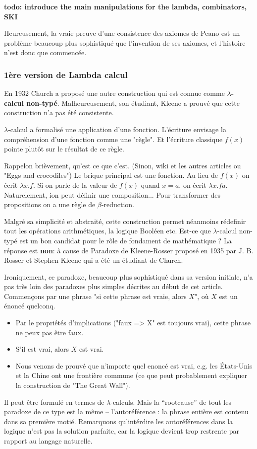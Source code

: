 \documentclass[12pt, a4paper]{article}
\begin{document}
\textbf{todo: introduce the main manipulations for the lambda, combinators, SKI}

Heureusement, la vraie preuve d'une consistence des axiomes de Peano est un problème beaucoup plus sophistiqué que l'invention de ses axiomes, et l'histoire n'est donc que commencée.

\subsubsection*{1ère version de Lambda calcul}
En 1932 Church a proposé une autre construction qui est connue comme \textbf{$\lambda$-calcul non-typé}.
Malheureusement, son étudiant, Kleene a prouvé que cette construction n'a pas été consistente.

$\lambda$-calcul a formalisé une application d'une fonction. L'écriture envisage la compréhension d'une fonction comme une "règle". Et l'écriture classique $f(x)$ pointe plutôt sur le résultat de ce règle.

Rappelon brièvement, qu'est ce que c'est. (Sinon, wiki et les autres articles ou "Eggs and crocodiles")
Le brique principal est une fonction. 
Au lieu de $f(x)$ on écrit $\lambda x.f$.
Si on parle de la valeur de $f(x)$ quand $x=a$, on écrit $\lambda x.f a$.
Naturelement, ion peut définir une composition...
Pour transformer des propositions on a une règle de $\beta$-reduction.

Malgré sa simplicité et abstraité, cette construction permet néanmoins rédefinir tout les opérations arithmétiques, la logique Booléen etc.
Est-ce que $\lambda$-calcul non-typé est un bon candidat pour le rôle de fondament de mathématique ?
La réponse est \textbf{non}: à cause de Paradoxe de Kleene-Rosser proposé en 1935 par J. B. Rosser et Stephen Kleene qui a été un étudiant de Church.

Ironiquement, ce paradoxe, beaucoup plus sophistiqué dans sa version initiale, n'a pas très loin des paradoxes plus simples décrites au début de cet article.
Commençons par une phrase "si cette phrase est vraie, alors $X$", où $X$ est un énoncé quelconq.
\begin{itemize}
	\item Par le propriétés d'implications ("faux => X" est toujours vrai), cette phrase ne peux pas être faux.
	\item S'il est vrai, alors $X$ est vrai.
	\item Nous venons de prouvé que n'importe quel enoncé est vrai, e.g. les États-Unis et la Chine ont une frontière commune (ce que peut probablement expliquer la construction de "The Great Wall").
\end{itemize}
Il peut être formulé en termes de $\lambda$-calculs.
Mais la ``rootcause'' de tout les paradoxe de ce type est la même -- l'autoréférence : la phrase entière est contenu dans sa première motié.
Remarquons qu'intérdire les autoréférences dans la logique n'est pas la solution parfaite, car la logique devient trop restrente par rapport au langage naturelle.
\end{document}

